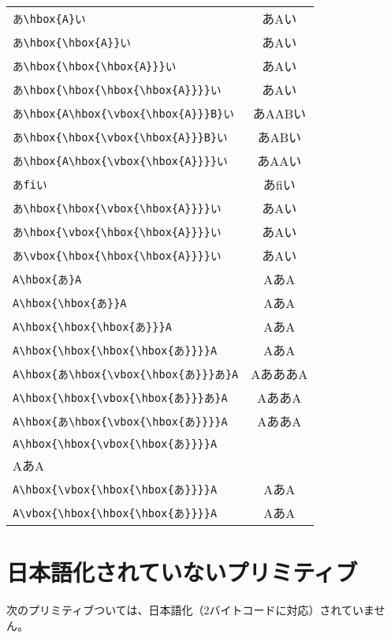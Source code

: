 \begin{tabular}{l@{ $\longrightarrow$ }c}
\verb|あ\hbox{A}い| & あ\hbox{A}い \\
\verb|あ\hbox{\hbox{A}}い| & あ\hbox{\hbox{A}}い \\
\verb|あ\hbox{\hbox{\hbox{A}}}い| & あ\hbox{\hbox{\hbox{A}}}い \\
\verb|あ\hbox{\hbox{\hbox{\hbox{A}}}}い| & あ\hbox{\hbox{\hbox{\hbox{A}}}}い \\
\verb|あ\hbox{A\hbox{\vbox{\hbox{A}}}B}い| &
					あ\hbox{A\hbox{\vbox{\hbox{A}}}B}い \\
\verb|あ\hbox{\hbox{\vbox{\hbox{A}}}B}い| &
					あ\hbox{\hbox{\vbox{\hbox{A}}}B}い \\
\verb|あ\hbox{A\hbox{\vbox{\hbox{A}}}}い| &
					あ\hbox{A\hbox{\vbox{\hbox{A}}}}い \\
\verb|あfiい| & あfiい \\
\verb|あ\hbox{\hbox{\vbox{\hbox{A}}}}い| &
					あ\hbox{\hbox{\vbox{\hbox{A}}}}い \\
\verb|あ\hbox{\vbox{\hbox{\hbox{A}}}}い| &
					あ\hbox{\vbox{\hbox{\hbox{A}}}}い \\
\verb|あ\vbox{\hbox{\hbox{\hbox{A}}}}い| &
					あ\vbox{\hbox{\hbox{\hbox{A}}}}い \\
\verb|A\hbox{あ}A| & A\hbox{あ}A \\
\verb|A\hbox{\hbox{あ}}A| & A\hbox{\hbox{あ}}A \\
\verb|A\hbox{\hbox{\hbox{あ}}}A| & A\hbox{\hbox{\hbox{あ}}}A \\
\verb|A\hbox{\hbox{\hbox{\hbox{あ}}}}A| & A\hbox{\hbox{\hbox{\hbox{あ}}}}A \\
\verb|A\hbox{あ\hbox{\vbox{\hbox{あ}}}あ}A| &
					A\hbox{あ\hbox{\vbox{\hbox{あ}}}あ}A \\
\verb|A\hbox{\hbox{\vbox{\hbox{あ}}}あ}A| &
					A\hbox{\hbox{\vbox{\hbox{あ}}}あ}A \\
\verb|A\hbox{あ\hbox{\vbox{\hbox{あ}}}}A| &
					A\hbox{あ\hbox{\vbox{\hbox{あ}}}}A \\
\verb|A\hbox{\hbox{\vbox{\hbox{あ}}}}A| \\
					A\hbox{\hbox{\vbox{\hbox{あ}}}}A \\
\verb|A\hbox{\vbox{\hbox{\hbox{あ}}}}A| &
					A\hbox{\vbox{\hbox{\hbox{あ}}}}A \\
\verb|A\vbox{\hbox{\hbox{\hbox{あ}}}}A| &
					A\vbox{\hbox{\hbox{\hbox{あ}}}}A \\
\end{tabular}

\section{日本語化されていないプリミティブ}
次のプリミティブついては、日本語化（2バイトコードに対応）されていません。


